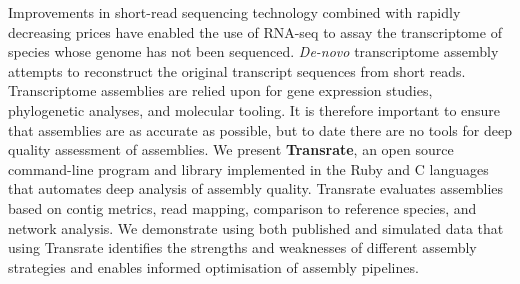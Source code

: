 Improvements in short-read sequencing technology combined with rapidly decreasing prices have enabled the use of RNA-seq to assay the transcriptome of species whose genome has not been sequenced. {\it De-novo} transcriptome assembly attempts to reconstruct the original transcript sequences from short reads. Transcriptome assemblies are relied upon for gene expression studies, phylogenetic analyses, and molecular tooling. It is therefore important to ensure that assemblies are as accurate as possible, but to date there are no tools for deep quality assessment of assemblies. We present \textbf{Transrate}, an open source command-line program and library implemented in the Ruby and C languages that automates deep analysis of assembly quality. Transrate evaluates assemblies based on contig metrics, read mapping, comparison to reference species, and network analysis. We demonstrate using both published and simulated data that using Transrate identifies the strengths and weaknesses of different assembly strategies and enables informed optimisation of assembly pipelines.